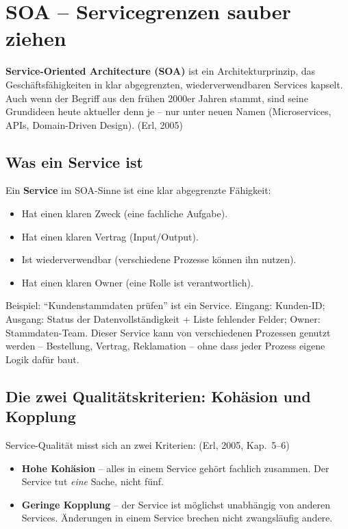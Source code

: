 \documentclass[11pt,a4paper,oneside]{article}
\newcommand{\fachbegriff}[1]{\textbf{#1}}
\newcommand{\quelle}[1]{{\footnotesize\color{lpGray}(#1)}}
\begin{document}
\section{SOA -- Servicegrenzen sauber ziehen}

\fachbegriff{Service-Oriented Architecture (SOA)} ist ein Architekturprinzip, das Geschäftsfähigkeiten in klar abgegrenzten, wiederverwendbaren Services kapselt. Auch wenn der Begriff aus den frühen 2000er Jahren stammt, sind seine Grundideen heute aktueller denn je -- nur unter neuen Namen (Microservices, APIs, Domain-Driven Design). \quelle{Erl, 2005}

\subsection{Was ein Service ist}

Ein \fachbegriff{Service} im SOA-Sinne ist eine klar abgegrenzte Fähigkeit:

\begin{itemize}
  \item Hat einen klaren Zweck (eine fachliche Aufgabe).
  \item Hat einen klaren Vertrag (Input/Output).
  \item Ist wiederverwendbar (verschiedene Prozesse können ihn nutzen).
  \item Hat einen klaren Owner (eine Rolle ist verantwortlich).
\end{itemize}

Beispiel: ``Kundenstammdaten prüfen'' ist ein Service. Eingang: Kunden-ID; Ausgang: Status der Datenvollständigkeit + Liste fehlender Felder; Owner: Stammdaten-Team. Dieser Service kann von verschiedenen Prozessen genutzt werden -- Bestellung, Vertrag, Reklamation -- ohne dass jeder Prozess eigene Logik dafür baut.

\subsection{Die zwei Qualitätskriterien: Kohäsion und Kopplung}

Service-Qualität misst sich an zwei Kriterien: \quelle{Erl, 2005, Kap.~5--6}

\begin{itemize}
  \item \fachbegriff{Hohe Kohäsion} -- alles in einem Service gehört fachlich zusammen. Der Service tut \emph{eine} Sache, nicht fünf.
  \item \fachbegriff{Geringe Kopplung} -- der Service ist möglichst unabhängig von anderen Services. Änderungen in einem Service brechen nicht zwangsläufig andere.
\end{itemize}
\end{document}
